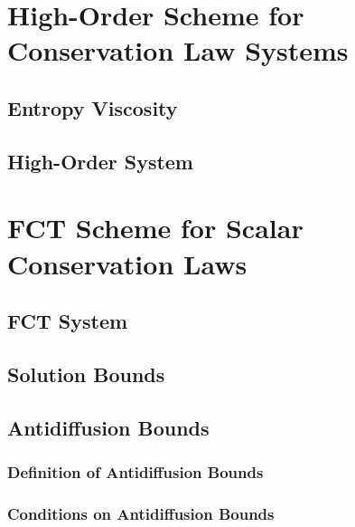 \section{High-Order Scheme for Conservation Law Systems
  \label{sec:high_order_system}}  

\subsection{Entropy Viscosity\label{sec:entropy_viscosity_system}}
    
\subsection{High-Order System\label{sec:high_order_scheme_system}}
  
\section{FCT Scheme for Scalar Conservation Laws\label{sec:fct_scalar}}

\subsection{FCT System\label{sec:fct_scheme_scalar}}
  
\subsection{Solution Bounds\label{sec:fct_bounds}}
  
\subsection{Antidiffusion Bounds\label{sec:antidiffusion_bounds}}
  
  \subsubsection{Definition of Antidiffusion Bounds
    \label{sec:antidiffusion_bounds_def}}
    
    
    
  \subsubsection{Conditions on Antidiffusion Bounds
    \label{sec:antidiffusion_bounds_signs}}
    
